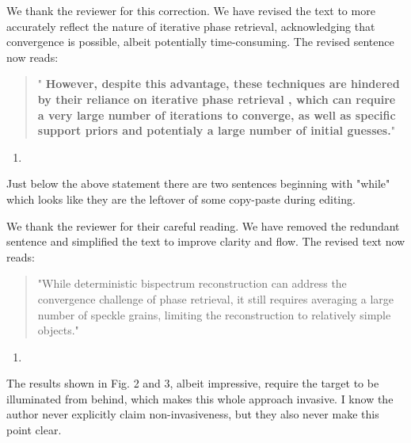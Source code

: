 \documentclass[12pt]{article}
\newenvironment{solved_reviewercomment}
    {\begin{tcolorbox}[width=\linewidth,colback=gray!5,colframe=solved_commentcolor!50,title=Reviewer Comment,left=5pt,right=5pt]}
    {\end{tcolorbox}}
\newenvironment{finished_ourresponse}
    {\begin{tcolorbox}[width=\linewidth,breakable,enhanced,colback=gray!5,colframe=finished_responsecolor!50,title=Response,left=5pt,right=5pt]}
    {\end{tcolorbox}}
\begin{document}
\begin{finished_ourresponse}
    We thank the reviewer for this correction. We have revised the text to more accurately reflect the nature of iterative phase retrieval, acknowledging that convergence is possible, albeit potentially time-consuming. The revised sentence now reads:  
    \begin{quote}
        "{\bfseries
        However, despite this advantage, these techniques are hindered by their reliance on iterative phase retrieval \cite{fienup1978reconstruction}, which can require a very large number of iterations to converge, as well as specific support priors and potentialy a large number of initial guesses.}"
    \end{quote}
    
\end{finished_ourresponse}



\begin{enumerate}[label=\arabic*., resume]
\item \leavevmode
\end{enumerate}
\vspace{-1em}
\begin{solved_reviewercomment}
    Just below the above statement there are two sentences beginning with "while" which looks like they are the leftover of some copy-paste during editing.
\end{solved_reviewercomment}
\begin{finished_ourresponse}
    We thank the reviewer for their careful reading. We have removed the redundant sentence and simplified the text to improve clarity and flow. The revised text now reads:
    \begin{quote}
        "While deterministic bispectrum reconstruction can address the convergence challenge of phase retrieval, it still requires averaging a large number of speckle grains, limiting the reconstruction to relatively simple objects."
    \end{quote}
\end{finished_ourresponse}


        
\begin{enumerate}[label=\arabic*., resume]
\item \leavevmode
\end{enumerate}
\vspace{-1em}
\begin{solved_reviewercomment}
    The results shown in Fig. 2 and 3, albeit impressive, require the target to be illuminated from behind, which makes this whole approach invasive. I know the author never explicitly claim non-invasiveness, but they also never make this point clear.
\end{solved_reviewercomment}
\end{document}
